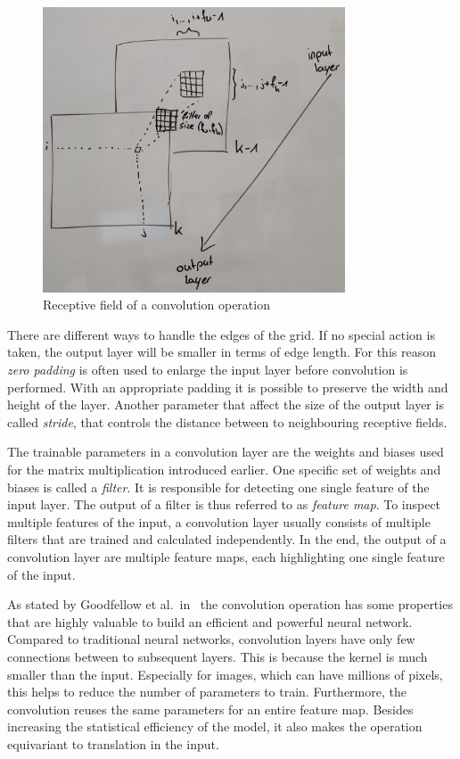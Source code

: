 \begin{figure}[h]
    \centering
    \includegraphics[width=0.8\textwidth]{images/convolution_template}
    \caption{Receptive field of a convolution operation }
    \label{fig:convolution}
\end{figure}

There are different ways to handle the edges of the grid. If no special action is taken, the output layer will be smaller in terms of edge length. For this reason \emph{zero padding} is often used to enlarge the input layer before convolution is performed. With an appropriate padding it is possible to preserve the width and height of the layer. Another parameter that affect the size of the output layer is called \emph{stride}, that controls the distance between to neighbouring receptive fields.~\cite[p.~361]{praxiseinstieg_ml17}

The trainable parameters in a convolution layer are the weights and biases used for the matrix multiplication introduced earlier. One specific set of weights and biases is called a \emph{filter}. It is responsible for detecting one single feature of the input layer. The output of a filter is thus referred to as \emph{feature map}. To inspect multiple features of the input, a convolution layer usually consists of multiple filters that are trained and calculated independently. In the end, the output of a convolution layer are multiple feature maps, each highlighting one single feature of the input.~\cite[p.~363 f]{praxiseinstieg_ml17}

As stated by Goodfellow et al.\ in~\cite{DLbook16} the convolution operation has some properties that are highly valuable to build an efficient and powerful neural network. Compared to traditional neural networks, convolution layers have only few connections between to subsequent layers. This is because the kernel is much smaller than the input. Especially for images, which can have millions of pixels, this helps to reduce the number of parameters to train.  Furthermore, the convolution reuses the same parameters for an entire feature map. Besides increasing the statistical efficiency of the model, it also makes the operation equivariant to translation in the input.

